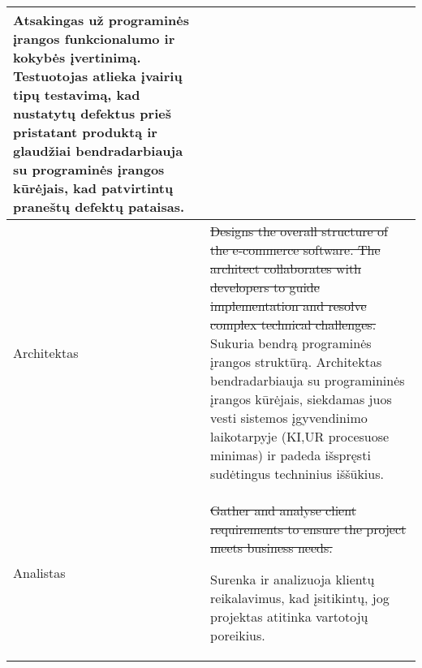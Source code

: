 \begin{table}[h!]
\begin{tabular}{p{}|p{}}
Atsakingas už programinės įrangos funkcionalumo ir kokybės įvertinimą. Testuotojas atlieka įvairių tipų testavimą, kad nustatytų defektus prieš pristatant produktą ir glaudžiai bendradarbiauja su programinės įrangos kūrėjais, kad patvirtintų praneštų defektų pataisas.
\\ \hline

Architektas & \st{Designs the overall structure of the e-commerce software. The architect collaborates with developers to guide implementation and resolve complex technical challenges. }
Sukuria bendrą programinės įrangos struktūrą. Architektas bendradarbiauja su programininės
įrangos kūrėjais, siekdamas juos vesti sistemos įgyvendinimo laikotarpyje (KI,UR procesuose minimas) ir padeda išspręsti sudėtingus techninius iššūkius.

\\ \hline
Analistas &  \st{Gather and analyse client requirements to ensure the project meets business needs.}

Surenka ir analizuoja klientų reikalavimus, kad įsitikintų, jog projektas atitinka vartotojų poreikius.
\\ \hline


\end{tabular}
\end{table}










